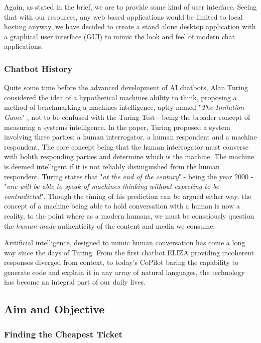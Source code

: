 \documentclass[11pt]{article}
\begin{document}
Again, as stated in the brief, we are to provide some kind of user interface. Seeing that with our resources, any web based applications would be limited to local hosting anyway, we have decided to create a stand alone desktop application with a graphical user interface (GUI) to mimic the look and feel of modern chat applications.

\subsubsection{Chatbot History} \label{chatbot-history}

Quite some time before the advanced development of AI chatbots, Alan Turing considered the idea of a hypothetical machines ability to think, proposing a method of benchmarking a machines intelligence, aptly named "\textit{The Imitation Game}" \cite{turing1950}, not to be confused with the Turing Test - being the broader concept of measuring a systems intelligence. In the paper, Turing proposed a system involving three parties: a human interrogator, a human respondent and a machine respondent. The core concept being that the human interrogator must converse with bohth responding parties and determine which is the machine. The machine is deemed intelligent if it is not reliably distinguished from the human respondent. Turing states that "\textit{at the end of the century}" - being the year 2000 - "\textit{one will be able to speak of machines thinking without expecting to be contradicted}". Though the timing of his prediction can be argued either way, the concept of a machine being able to hold conversation with a human is now a reality, to the point where as a modern humans, we must be consciously question the \textit{human-made} authenticity of the content and media we consume.

Aritificial intelligence, designed to mimic human conversation has come a long way since the days of Turing. From the first chatbot ELIZA \cite{eliza} providing incoherent responses diverged from context, to today's CoPilot \cite{copilot} baring the capability to generate code and explain it in any array of natural languages, the technology has become an integral part of our daily lives.


\subsection{Aim and Objective} \label{aim-objective}

\subsubsection{Finding the Cheapest Ticket} \label{finding-cheapest-ticket}
\end{document}
